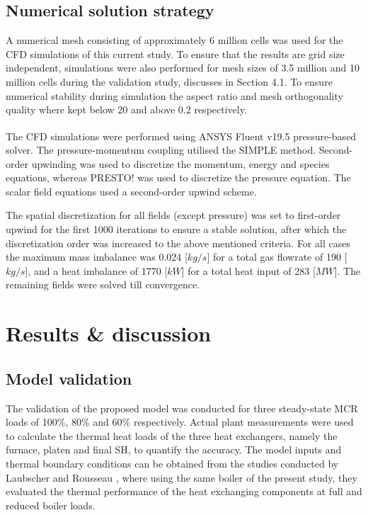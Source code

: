 \documentclass[twocolumn,10pt]{asme2ej}
\begin{document}
\subsection{Numerical solution strategy}\label{sec_num_sol}
A numerical mesh consisting of approximately 6 million cells was used for the CFD simulations of this current study. To ensure that the results are grid size independent, simulations were also performed for mesh sizes of 3.5 million and 10 million cells during the validation study, discusses in Section 4.1. To ensure numerical stability during simulation the aspect ratio and mesh orthogonality quality where kept below 20 and above 0.2 respectively. %

The CFD simulations were performed using ANSYS Fluent v19.5\textsuperscript{\textregistered} pressure-based solver. The pressure-momentum coupling utilised the SIMPLE method. Second-order upwinding was used to discretize the momentum, energy and species equations, whereas PRESTO! was used to discretize the pressure equation. The scalar field equations used a second-order upwind scheme.

The spatial discretization for all fields (except pressure) was set to first-order upwind for the first 1000 iterations to ensure a stable solution, after which the discretization order was increased to the above mentioned criteria. For all cases the maximum mass imbalance was 0.024 [$kg/s$] for a total gas flowrate of 190 [$kg/s$], and a heat imbalance of 1770 [$kW$] for a total heat input of 283 [$MW$]. The remaining fields were solved till convergence.

\section{Results \& discussion}
\subsection{Model validation}\label{sec_model_valid}
The validation of the proposed model was conducted for three steady-state MCR loads of 100\%, 80\% and 60\% respectively. Actual plant measurements were used to calculate the thermal heat loads of the three heat exchangers, namely the furnace, platen and final SH, to quantify the accuracy. The model inputs and thermal boundary conditions can be obtained from the studies conducted by Laubscher and Rousseau \cite{Laubscher2019b, Laubscher2020b}, where using the same boiler of the present study, they evaluated the thermal performance of the heat exchanging components at full and reduced boiler loads.
\end{document}

